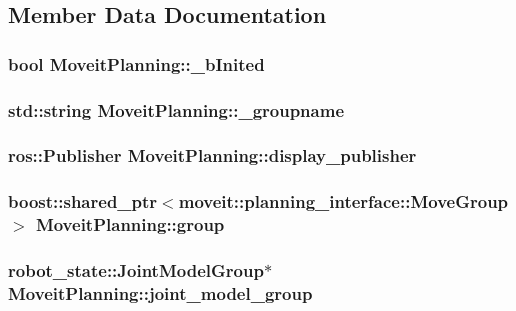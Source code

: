 \subsection{Member Data Documentation}
\hypertarget{classMoveitPlanning_a64c359d7383623d1dc1976060a5a8e73}{
\subsubsection[{\-\_\-b\-Inited}]{\setlength{\rightskip}{0pt plus 5cm}bool Moveit\-Planning\-::\-\_\-b\-Inited}}\label{classMoveitPlanning_a64c359d7383623d1dc1976060a5a8e73}
\hypertarget{classMoveitPlanning_a56cf116dfd39c4ba4fb16df4b70c8a29}{
\subsubsection[{\-\_\-groupname}]{\setlength{\rightskip}{0pt plus 5cm}std\-::string Moveit\-Planning\-::\-\_\-groupname}}\label{classMoveitPlanning_a56cf116dfd39c4ba4fb16df4b70c8a29}
\hypertarget{classMoveitPlanning_a51be3d19d403e4872374062888171a22}{
\subsubsection[{display\-\_\-publisher}]{\setlength{\rightskip}{0pt plus 5cm}ros\-::\-Publisher Moveit\-Planning\-::display\-\_\-publisher}}\label{classMoveitPlanning_a51be3d19d403e4872374062888171a22}
\hypertarget{classMoveitPlanning_a8c2fe5775408e0e3afe6288f9b9facd5}{
\subsubsection[{group}]{\setlength{\rightskip}{0pt plus 5cm}boost\-::shared\-\_\-ptr$<$moveit\-::planning\-\_\-interface\-::\-Move\-Group$>$ Moveit\-Planning\-::group}}\label{classMoveitPlanning_a8c2fe5775408e0e3afe6288f9b9facd5}
\hypertarget{classMoveitPlanning_a1e4e53d7560c0148712e7cc00b314085}{
\subsubsection[{joint\-\_\-model\-\_\-group}]{\setlength{\rightskip}{0pt plus 5cm}robot\-\_\-state\-::\-Joint\-Model\-Group$\ast$ Moveit\-Planning\-::joint\-\_\-model\-\_\-group}}\label{classMoveitPlanning_a1e4e53d7560c0148712e7cc00b314085}
